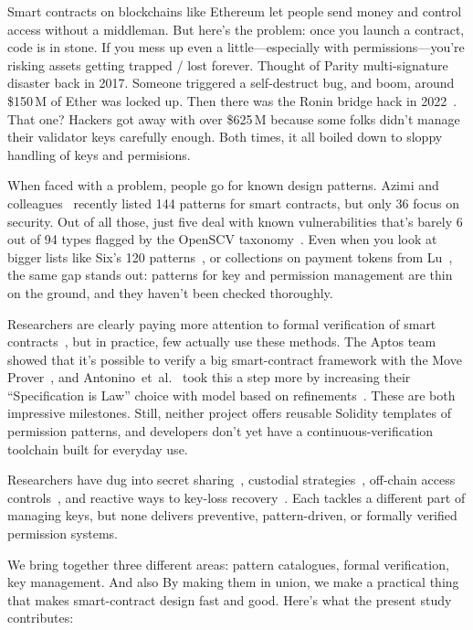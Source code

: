 \documentclass[conference]{IEEEtran}
\begin{document}
Smart contracts on blockchains like Ethereum
let people send money and control access without a middleman.  But
here's the problem: once you launch a contract, code is in
stone.  If you mess up even a little—especially with
permissions—you're risking assets getting trapped / lost forever.
Thought of Parity multi-signature disaster back in
2017.  Someone triggered a self-destruct bug, and
boom, around \$150\,M of Ether was locked up.  Then there was
the Ronin bridge hack in 2022~\cite{ronin2022}.  That one?  Hackers
got away with over \$625\,M because some folks didn't manage their
validator keys carefully enough.  Both times, it all boiled down to
sloppy handling of keys and permisions.

When faced with a problem, people go for known design
patterns. Azimi and colleagues~\cite{azimi2025systematic} recently
listed 144 patterns for smart contracts, but only 36 focus on
security.  Out of all those, just five deal with known
vulnerabilities that's barely 6 out of 94 types flagged by the
OpenSCV taxonomy~\cite{vidal2024openscv}.  Even when you look at
bigger lists like Six's 120 patterns~\cite{six2022blockchain}, or
collections on payment tokens from
Lu~\cite{lu2021patterns}, the same gap stands out: patterns for key
and permission management are thin on the ground, and they haven't
been checked thoroughly.

Researchers are clearly paying more attention to formal verification
of smart contracts~\cite{tolmach2022survey}, but in practice, few
actually use these methods.  The Aptos team showed that it's possible
to verify a big smart-contract framework with the Move
Prover~\cite{park2024securing}, and
Antonino~et~al.~\cite{antonino2022specification} took this a step
more by increasing their ``Specification is Law'' choice with
model based on refinements~\cite{antonino2024refinement}.  These are
both impressive milestones.  Still, neither project offers reusable
Solidity templates of permission patterns, and developers
don't yet have a continuous-verification toolchain built for everyday
use.

Researchers have dug into secret
sharing~\cite{wu2024blockchain}, custodial
strategies~\cite{takei2024keymgmt}, off-chain access
controls~\cite{goint2023secure}, and reactive ways to key-loss
recovery~\cite{blackshear2021kelp}.  Each tackles a different part of
managing keys, but none delivers preventive, pattern-driven, or
formally verified permission systems.

We bring together three different areas: pattern catalogues, formal
verification, key management. And also By making them in union, we make a
practical thing that makes smart-contract design fast and
good.  Here's what the present study contributes:
\end{document}
